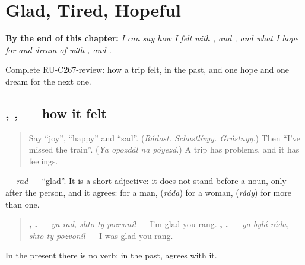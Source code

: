 
\chapter{Glad, Tired, Hopeful}
\label{ch:ru-glad-tired-hopeful}

\begin{chapteropening}
\textbf{By the end of this chapter:} \emph{I can say how I felt with   ,   and   , and what I hope for and dream of with  ,  and  .}

Complete RU-C267-review: how a trip felt, in the past, and one hope and one dream for the next one.
\end{chapteropening}

\section[\texorpdfstring{\ru{я} \ru{был} \ru{рад}, \ru{я} … (ya byl rad, ya …)}{я был рад, я … (ya byl rad, ya …)}]{  ,  ,    — how it felt}

\label{lesson:RU-C267-ya-byl-rad}



\begin{quote}
Say \textquotedblleft{}joy\textquotedblright{}, \textquotedblleft{}happy\textquotedblright{} and \textquotedblleft{}sad\textquotedblright{}. (\emph{Rádost. Schastlívyy. Grústnyy.}) Then \textquotedblleft{}I've missed the train\textquotedblright{}. (\emph{Ya opozdál na póyezd.}) A trip has problems, and it has feelings.
\end{quote}

\begin{grammarlens}[title={Grammar Lens: \ru{рад}, glad}]
\textbf{} — \emph{rad} — \textquotedblleft{}glad\textquotedblright{}. It is a short adjective: it does not stand before a noun, only after the person, and it agrees: \textbf{} for a man, \textbf{} (\emph{ráda}) for a woman, \textbf{} (\emph{rády}) for more than one.

\begin{quote}
\textbf{ ,   .} — \emph{ya rad, shto ty pozvoníl} — I'm glad you rang. \textbf{  ,   .} — \emph{ya bylá ráda, shto ty pozvoníl} — I was glad you rang.
\end{quote}

In the present there is no verb; in the past, \textbf{} agrees with it.
\end{grammarlens}

